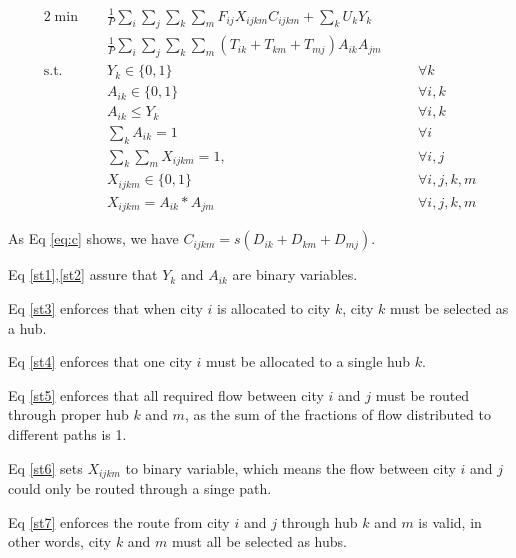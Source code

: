 \documentclass{llncs}
\begin{document}
	
	\begin{alignat}{2}
	\min\quad
	& \frac{1}{P} \sum_{i}\sum_{j}\sum_{k}\sum_{m}F_{ij}  X_{ijkm} C_{ijkm} + \sum_{k}U_k Y_{k} \nonumber & &\\
	\quad& \frac{1}{P} \sum_{i}\sum_{j}\sum_{k}\sum_{m}{(T_{ik}+ T_{km}+ T_{mj} ) A_{ik} A_{jm}}  & & \tag{LP1}\\
	\mbox{s.t.}  \quad
	&Y_{k} \in \{0,1\} &\quad& \forall k \label{st1}\\ 
	&A_{ik} \in \{0,1\} &\quad& \forall i,k \label{st2}\\ 
	&A_{ik} \leq Y_{k} &\quad& \forall i,k \label{st3}\\
	&\sum_{k}{A_{ik}} = 1 &\quad& \forall i \label{st4}\\
	&\sum_{k}\sum_{m}{X_{ijkm} = 1}, &\quad& \forall i,j \label{st5}\\
	&X_{ijkm} \in \{0,1\} &\quad& \forall i,j,k,m \label{st6}\\
	&X_{ijkm} = A_{ik} * A_{jm} &\quad& \forall i,j,k,m \label{st7}
	\end{alignat}
	
	As Eq \ref{eq:c} shows, we have $ C_{ijkm} = s(D_{ik}+D_{km}+D_{mj})$.
	
	Eq \ref{st1},\ref{st2} assure that $Y_k$ and $A_{ik}$ are binary variables.
	
	Eq \ref{st3} enforces that when city $i$ is allocated to city $k$, city $k$ must be selected as a hub.
	
	Eq \ref{st4} enforces that one city $i$ must be allocated to a single hub $k$.
	
	Eq \ref{st5} enforces that all required flow between city $i$ and $j$ must be routed through proper hub $k$ and $m$, as the sum of the fractions of flow distributed to different paths is 1.
	
	Eq \ref{st6} sets $X_{ijkm}$ to binary variable, which means the flow between city $i$ and $j$ could only be routed through a singe path.
	
	Eq \ref{st7} enforces the route from city $i$ and $j$ through hub $k$ and $m$ is valid, in other words, city $k$ and $m$ must all be selected as hubs. \\
\end{document}
